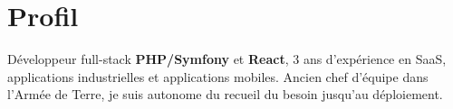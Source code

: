

\section*{ Profil}
Développeur full-stack \textbf{\color{maincolor}PHP/Symfony} et \textbf{\color{maincolor}React}, 3 ans d'expérience en SaaS, applications industrielles et applications mobiles.
Ancien chef d'équipe dans l'Armée de Terre, je suis autonome du recueil du besoin jusqu'au déploiement.
